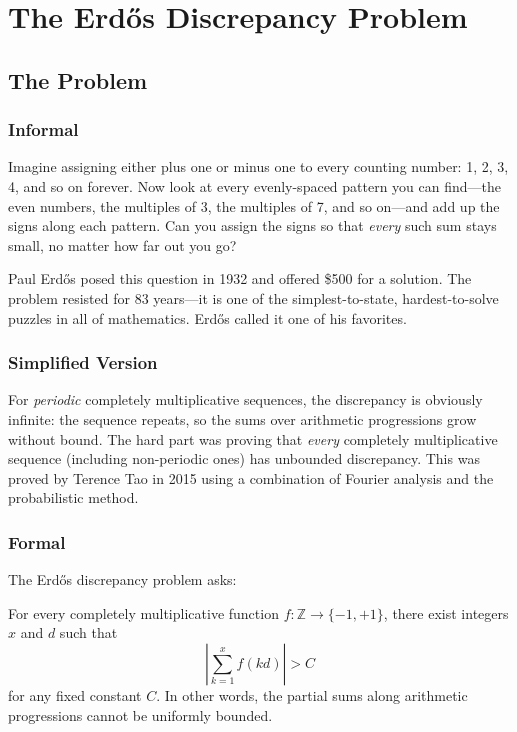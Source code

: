 \let\LocalMacro\relax

\chapter{The Erdős Discrepancy Problem}

\section{The Problem}

\subsection{Informal}
Imagine assigning either plus one or minus one to every counting number: 1, 2, 3, 4, and so on forever. Now look at every evenly-spaced pattern you can find---the even numbers, the multiples of 3, the multiples of 7, and so on---and add up the signs along each pattern. Can you assign the signs so that \emph{every} such sum stays small, no matter how far out you go?

\begin{historicalbox}
Paul Erdős posed this question in 1932 and offered \$500 for a solution. The problem resisted for 83 years---it is one of the simplest-to-state, hardest-to-solve puzzles in all of mathematics. Erdős called it one of his favorites.
\end{historicalbox}

\subsection{Simplified Version}
For \emph{periodic} completely multiplicative sequences, the discrepancy is obviously infinite: the sequence repeats, so the sums over arithmetic progressions grow without bound. The hard part was proving that \emph{every} completely multiplicative sequence (including non-periodic ones) has unbounded discrepancy. This was proved by Terence Tao in 2015 using a combination of Fourier analysis and the probabilistic method.

\subsection{Formal}
The Erd\H{o}s discrepancy problem asks:
\begin{conjecture}[Erd\H{o}s, 1957]
For every completely multiplicative function $f: \mathbb{Z} \to \{-1, +1\}$, there exist integers $x$ and $d$ such that
\[
\left| \sum_{k=1}^{x} f(kd) \right| > C
\]
for any fixed constant $C$. In other words, the partial sums along arithmetic progressions cannot be uniformly bounded.
\end{conjecture}

